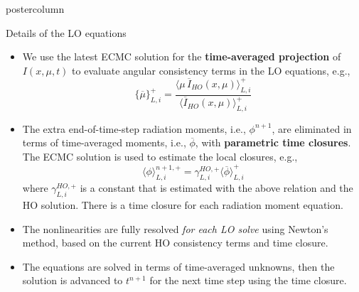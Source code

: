 \documentclass[xcolor=dvipsnames]{beamer}
\newcommand{\mom}[1]{\langle #1 \rangle}
\newcommand{\colb}[1]{{\color{blue} #1}}
\begin{document}
\begin{frame}
\begin{columns}
\begin{column}{.49\textwidth}
\begin{beamercolorbox}[center,wd=\textwidth]{postercolumn}
\begin{minipage}[T]{0.95\textwidth}
{\begin{block}{Details of the LO equations}
\begin{itemize}
\item We use the latest ECMC solution for the \textbf{time-averaged projection} of
    $I(x,\mu,t)$ to evaluate \colb{angular consistency terms} in the LO equations, e.g.,
        \begin{equation*}
            \{\overline \mu\}^{+}_{L,i} = \frac{\mom{\mu\, \overline I_{HO}\left( x,\mu \right)}_{L,i}^+}{\mom{\overline
                I_{HO}\left(x,\mu\right)}_{L,i}^+}
        \end{equation*}
        \item The extra end-of-time-step radiation moments, i.e., $\phi^{n+1}$, are
            eliminated in terms of time-averaged moments, i.e., $\overline \phi$, with
            \textbf{parametric time closures}.  The ECMC solution is used to estimate the
            \colb{local     closures}, e.g.,
            \begin{equation*}
                \mom{\phi}_{L,i}^{n+1,+} = {\gamma^{HO,+}_{L,i}} {\mom{\overline{\phi}}}^+_{L,i} 
            \end{equation*}
            where $\gamma^{HO,+}_{L,i}$ is a constant that is estimated with the above relation and the
            HO solution.  There is a time closure for each radiation moment equation.
        \item  The nonlinearities are fully resolved \emph{for each LO solve} using \colb{Newton's
method,} based on the current HO consistency terms and time closure.

        \item The equations are solved in terms of time-averaged unknowns, then the
            solution is advanced to $t^{n+1}$ for the next time step
            using the time closure.
    \end{itemize}
\end{block}

}
\end{minipage}
\end{beamercolorbox}
\end{column}
\end{columns}
\end{frame}
\end{document}
